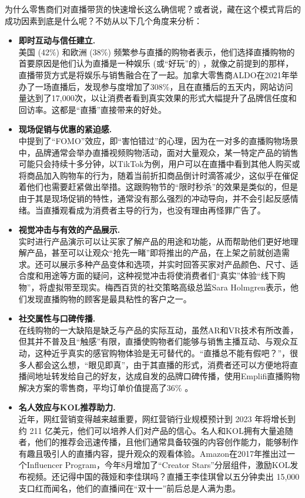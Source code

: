 \documentclass[12pt]{ctexart}
\begin{document}
为什么零售商们对直播带货的快速增长这么确信呢？或者说，藏在这个模式背后的成功因素到底是什么呢？不妨从以下几个角度来分析：
\begin{itemize}
    \item \textbf{即时互动与信任建立.} \\
    美国 (42\%) 和欧洲 (38\%) 频繁参与直播的购物者表示，他们选择直播购物的首要原因是他们认为直播是一种娱乐 (或“好玩”的) \cite{10}，就像之前提到的那样，直播带货方式是将娱乐与销售融合在了一起。加拿大零售商ALDO在2021年举办了一场直播后，发现参与度增加了308\%，且在直播后的五天内，网站访问量达到了17,000次\cite{11}，以让消费者看到真实效果的形式大幅提升了品牌信任度和回访率。这都是“直播”直接带来的好处。
    \item \textbf{现场促销与优惠的紧迫感.} \\
    \cite{11}中提到了“FOMO”效应，即“害怕错过”的心理，因为在一对多的直播购物场景中，品牌通常会举办直播视频购物活动，面对大量观众，某一特定产品的销售可能只会持续十多分钟，以TikTok为例，用户可以在直播中看到其他人购买或将商品加入购物车的行为，随着当前折扣商品倒计时滴答减少，这似乎在催促着他们也需要赶紧做出举措。这跟购物节的“限时秒杀”的效果是类似的，但是由于其是现场促销的特性，通常没有那么强烈的冲动导向，并不会引起反感情绪。当直播观看成为消费者主导的行为，也没有理由再怪罪广告了。
    \item \textbf{视觉冲击与有效的产品展示.} \\
    实时进行产品演示可以让买家了解产品的用途和功能，从而帮助他们更好地理解产品，甚至可以让观众“抢先一睹”即将推出的产品，在上架之前就创造需求\cite{12}。还可以展示多种产品变体和选项，并实时回答买家对产品颜色、尺寸、适合度和用途等方面的疑问，这种视觉冲击将使消费者们“真实”体验“线下购物”，将虚拟带至现实。梅西百货的社交策略高级总监Sara Holmgren表示，他们发现直播购物的顾客是最具粘性的客户之一\cite{11}。
    \item \textbf{社交属性与口碑传播.} \\
    在线购物的一大缺陷是缺乏与产品的实际互动，虽然AR和VR技术有所改善，但其并不普及且“触感”有限\cite{12}，直播使购物者们能够与销售主播互动、与观众互动，这种近乎真实的感官购物体验是无可替代的。“直播总不能有假吧？”，很多人都会这么想，“眼见即真”，由于其直播的形式，消费者还可以方便地将直播间地址转发给自己的好友，达成自发的品牌口碑传播，使用Emplifi直播购物解决方案的零售商，平均订单价值提高了36\% \cite{12}。
    \item \textbf{名人效应与KOL推荐助力.} \\
    近年，网红营销变得越来越重要，网红营销行业规模预计到 2023 年将增长到约 211 亿美元\cite{13}，他们可以培养人们对产品的信心。名人和KOL拥有大量追随者，他们的推荐会迅速传播，且他们通常具备较强的内容创作能力，能够制作有趣且吸引人的直播内容，提升观众的观看体验。Amazon在2017年推出过一个Influencer Program，今年8月增加了“Creator Stars”分层组件，激励KOL发布视频\cite{14}。还记得中国的薇娅和李佳琪吗？直播王李佳琪曾以五分钟卖出 15,000 支口红而闻名\cite{15}，他们的直播间在“双十一”前后总是人满为患。
\end{itemize}
\end{document}
